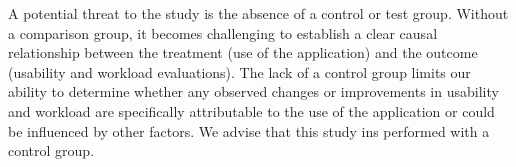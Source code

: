 A potential threat to the study is the absence of a control or test group.
Without a comparison group, it becomes challenging to establish a clear causal
relationship between the treatment (use of the application) and the outcome
(usability and workload evaluations). The lack of a control group limits our
ability to determine whether any observed changes or improvements in usability
and workload are specifically attributable to the use of the application or
could be influenced by other factors. We advise that this study ins performed
with a control group.
